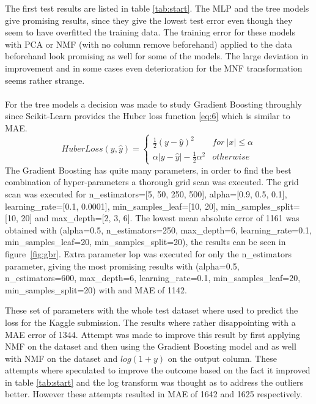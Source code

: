 \documentclass[a4paper]{article}
\begin{document}
The first test results are listed in table \ref{tab:start}. The MLP and the tree models give promising results, since they give the lowest test error even though they seem to have overfitted the training data. The training error for these models with PCA or NMF (with no column remove beforehand) applied to the data beforehand look promising as well for some of the models. The large deviation in improvement and in some cases even deterioration for the MNF transformation seems rather strange. \\\\
For the tree models a decision was made to study Gradient Boosting throughly since Scikit-Learn provides the Huber loss function \ref{eq:6} which is similar to MAE.
\begin{equation} \label{eq:6}
HuberLoss(y, \hat{y}) = \begin{cases} 
                  \frac{1}{2}(y - \hat{y})^2 & for\ |x|\leq \alpha \\
                  \alpha|y - \hat{y}|-\frac{1}{2}\alpha^2 & otherwise
               \end{cases}
\end{equation}
The Gradient Boosting has quite many parameters, in order to find the best combination of hyper-parameters a thorough grid scan was executed. The grid scan was executed for n\_estimators=[5, 50, 250, 500], alpha=[0.9, 0.5, 0.1], learning\_rate=[0.1, 0.0001], min\_samples\_leaf=[10, 20], min\_samples\_split=[10, 20] and max\_depth=[2, 3, 6]. The lowest mean absolute error of 1161 was obtained with (alpha=0.5, n\_estimators=250, max\_depth=6, learning\_rate=0.1, min\_samples\_leaf=20, min\_samples\_split=20), the results can be seen in figure~\ref{fig:gbr}. Extra parameter lop was executed for only the n\_estimators parameter, giving the most promising results with (alpha=0.5, n\_estimators=600, max\_depth=6, learning\_rate=0.1, min\_samples\_leaf=20, min\_samples\_split=20) with and MAE of 1142.

These set of parameters with the whole test dataset where used to predict the loss for the Kaggle submission. The results where rather disappointing with a MAE error of 1344. Attempt was made to improve this result by first applying NMF on the dataset and then using the Gradient Boosting model and as well with NMF on the dataset and $log(1 + y)$ on the output column. These attempts where speculated to improve the outcome based on the fact it improved in table \ref{tab:start} and the log transform was thought as to address the outliers better. However these attempts resulted in MAE of 1642 and 1625 respectively.
\end{document}
